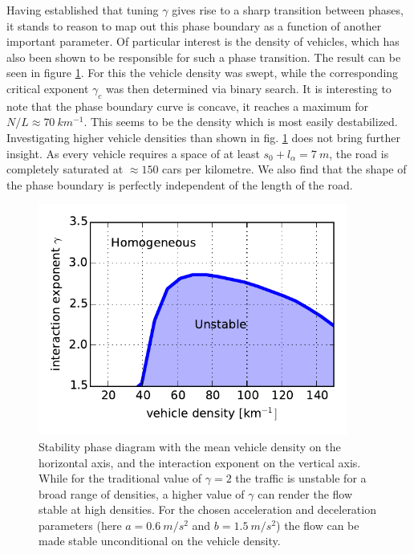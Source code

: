 Having established that tuning $\gamma$ gives rise to a sharp transition between phases, it stands to reason to map out this phase boundary as a function of another important parameter. Of particular interest is the density of vehicles, which has also been shown to be responsible for such a phase transition. The result can be seen in figure \ref{fig:phase_diagram}. For this the vehicle density was swept, while the corresponding critical exponent $\gamma_c$ was then determined via binary search. It is interesting to note that the phase boundary curve is concave, it reaches a maximum for $N/L \approx \SI{70}{km^{-1}}$. This seems to be the density which is most easily destabilized. Investigating higher vehicle densities than shown in fig. \ref{fig:phase_diagram} does not bring further insight. As every vehicle requires a space of at least $s_0+l_\alpha= \SI{7}{m}$, the road is completely saturated at $\approx 150$ cars per kilometre. We also find that the shape of the phase boundary is perfectly independent of the length of the road.
\begin{figure}
    \centering
    \includegraphics[width=4in]{../img/phase_diagram.pdf}
    \caption{Stability phase diagram with the mean vehicle density on the horizontal axis, and the interaction exponent on the vertical axis. While for the traditional value of $\gamma=2$ the traffic is unstable for a broad range of densities, a higher value of $\gamma$ can render the flow stable at high densities. For the chosen acceleration and deceleration parameters (here $a=\SI{0.6}{m/s^2}$ and $b=\SI{1.5}{m/s^2}$) the flow can be made stable unconditional on the vehicle density.}
    \label{fig:phase_diagram}
\end{figure}


